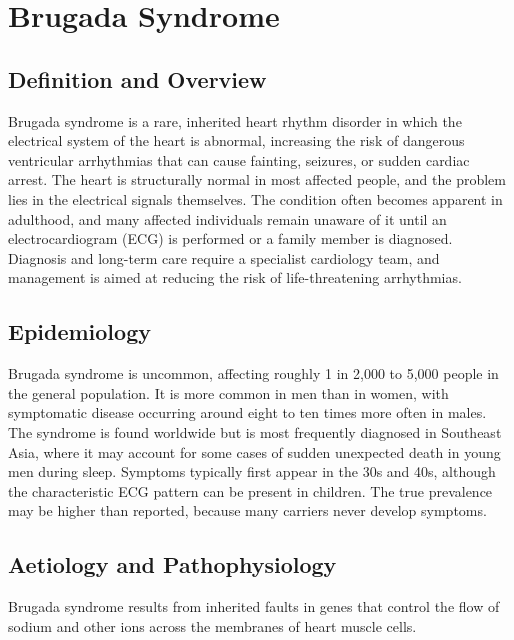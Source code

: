 \chapter{Brugada Syndrome}

\section*{Definition and Overview}
Brugada syndrome is a rare, inherited heart rhythm disorder in which the electrical system of the heart is abnormal, increasing the risk of dangerous ventricular arrhythmias that can cause fainting, seizures, or sudden cardiac arrest. The heart is structurally normal in most affected people, and the problem lies in the electrical signals themselves. The condition often becomes apparent in adulthood, and many affected individuals remain unaware of it until an electrocardiogram (ECG) is performed or a family member is diagnosed. Diagnosis and long-term care require a specialist cardiology team, and management is aimed at reducing the risk of life-threatening arrhythmias.

\section*{Epidemiology}
Brugada syndrome is uncommon, affecting roughly 1 in 2,000 to 5,000 people in the general population. It is more common in men than in women, with symptomatic disease occurring around eight to ten times more often in males. The syndrome is found worldwide but is most frequently diagnosed in Southeast Asia, where it may account for some cases of sudden unexpected death in young men during sleep. Symptoms typically first appear in the 30s and 40s, although the characteristic ECG pattern can be present in children. The true prevalence may be higher than reported, because many carriers never develop symptoms.

\section*{Aetiology and Pathophysiology}
Brugada syndrome results from inherited faults in genes that control the flow of sodium and other ions across the membranes of heart muscle cells.

